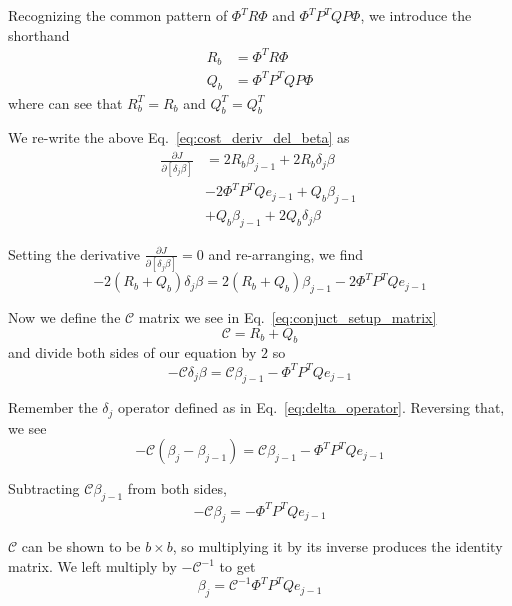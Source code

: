 Recognizing the common pattern of $\Phi^T R \Phi$ and $\Phi^T P^T Q P \Phi$, we introduce the shorthand
\begin{align}
    R_b &= \Phi^T R \Phi \\
    Q_b &= \Phi^T P^T Q P \Phi
\end{align}
where can see that $R_b^T = R_b$ and $Q_b^T = Q_b^T$

We re-write the above Eq.~\ref{eq:cost_deriv_del_beta} as
\begin{equation}
    \begin{split}
        \frac{\partial J}{\partial \left[\delta_j \beta \right]} &= 2 R_b \beta_{j-1} + 2 R_b \delta_j \beta \\
        &- 2\Phi^T P^T Q e_{j-1} + Q_b \beta_{j-1} \\
        &+ Q_b \beta_{j-1} + 2 Q_b \delta_j \beta
    \end{split}
~\label{eq:cost_deriv_del_beta_short}
\end{equation}

Setting the derivative $\frac{\partial J}{\partial \left[\delta_j \beta \right]} = 0$ and re-arranging, we find
\begin{equation}
    -2\left(R_b + Q_b\right) \delta_j \beta = 2\left(R_b + Q_b \right)\beta_{j-1} - 2\Phi^T P^T Q e_{j-1}
\end{equation}

Now we define the $\mathcal{C}$ matrix we see in Eq.~\ref{eq:conjuct_setup_matrix}
\begin{equation}
    \mathcal{C} = R_b + Q_b
\end{equation}
and divide both sides of our equation by $2$ so
\begin{equation}
    -\mathcal{C} \delta_j \beta = \mathcal{C}\beta_{j-1} - \Phi^T P^T Q e_{j-1}
\end{equation}

Remember the $\delta_j$ operator defined as in Eq.~\ref{eq:delta_operator}. Reversing that, we see
\begin{equation}
    -\mathcal{C} \left(\beta_j - \beta_{j-1}\right) = \mathcal{C}\beta_{j-1} - \Phi^T P^T Q e_{j-1}
\end{equation}

Subtracting $\mathcal{C}\beta_{j-1}$ from both sides,
\begin{equation}
    -\mathcal{C} \beta_j = - \Phi^T P^T Q e_{j-1}
\end{equation}

$\mathcal{C}$ can be shown to be $b \times b$, so multiplying it by its inverse produces the identity matrix. We left multiply by $-\mathcal{C}^{-1}$ to get
\begin{equation}
    \beta_j = \mathcal{C}^{-1} \Phi^T P^T Q e_{j-1}
\end{equation}

